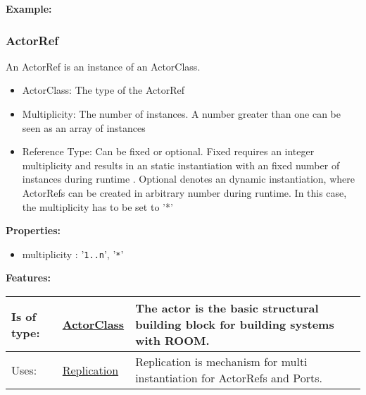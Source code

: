 	\textbf{Example:}
	
		
	
	\vspace{\baselineskip}
	\vspace{\baselineskip}
	\vspace{\baselineskip}
	
\subsubsection{ActorRef}
	\hypertarget{ref:ActorRef}{}
	An ActorRef is an instance of an ActorClass.
		
	\begin{itemize}
		\item ActorClass: The type of the ActorRef
		\item Multiplicity: The number of instances. A number greater than one can be seen as an array of instances
		\item Reference Type: Can be fixed or optional. Fixed requires an integer multiplicity and results in an static instantiation with an fixed number of instances during runtime . Optional denotes an dynamic instantiation, where ActorRefs can be created in arbitrary number during runtime. In this case, the multiplicity has to be set to '*'
	\end{itemize}
		
	\textbf{Properties:}
	\begin{itemize}
	\item multiplicity : '\verb|1..n|', '\verb|*|'
	\end{itemize}
		
	\begingroup
	\textbf{Features:}
	\renewcommand{\arraystretch}{1.8} %
	\begin{longtable}{l|l p{}}
		\hline
	Is of type: & \tabitem \hyperlink{ref:ActorClass}{ActorClass}  & The actor is the basic structural building block for building systems with ROOM.\\
	\hline
	Uses: & \tabitem \hyperlink{ref:Replication}{Replication}  & Replication is mechanism for multi instantiation for ActorRefs and Ports.\\
	\hline
	\end{longtable}
	\endgroup
		
